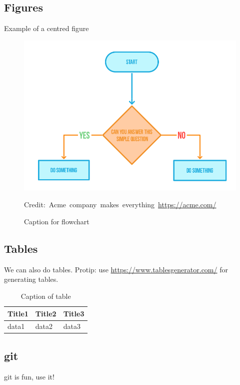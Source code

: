 \subsection{Figures}

Example of a centred figure
\begin{figure}[H]
    \centering
    \includegraphics[scale=0.5]{figures/Flowchart}
    \caption{Caption for flowchart}
  	\medskip 
	\hspace*{15pt}\hbox{\scriptsize Credit: Acme company makes everything \url{https://acme.com/}}
    \label{FlowchartFigure}
\end{figure}

\subsection{Tables}

We can also do tables. Protip: use \url{https://www.tablesgenerator.com/} for generating tables.
\begin{table}[H]
\centering
\caption{Caption of table}
\label{TableLabel}
\begin{tabular}{|l|l|l|}
\hline
Title1 & Title2 & Title3 \\ \hline
data1  & data2  & data3  \\ \hline
\end{tabular}
\end{table}

\subsection{\gls{git}}

\gls{git} is fun, use it!
